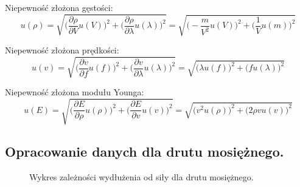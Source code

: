 \documentclass [a4paper,11pt]{article}
\begin{document}
	Niepewność złożona gęstości:
	\begin{equation}
	u(\rho)=\sqrt{\bigg(\frac{\partial \rho}{\partial V}u(V)\bigg)^2+\bigg(\frac{\partial \rho}{\partial \lambda}u(\lambda)\bigg)^2}=\sqrt{\bigg(-\frac{m}{V^2}u(V)\bigg)^2+\bigg(\frac{1}{V}u(m) \bigg)^2}
	\end{equation}
	
	Niepewność złożona prędkości:
	\begin{equation}
	u(v)=\sqrt{\bigg(\frac{\partial v}{\partial f}u(f)\bigg)^2+\bigg(\frac{\partial v}{\partial \lambda}u(\lambda)\bigg)^2}=\sqrt{\bigg(\lambda u(f)\bigg)^2+\bigg(f u(\lambda)\bigg)^2}
	\end{equation}
	
	Niepewność złożona modułu Younga:
	\begin{equation}
			 u(E)=\sqrt{\bigg(\frac{\partial E}{\partial \rho}u(\rho)\bigg)^2+\bigg(\frac{\partial E}{\partial v}u(v)\bigg)^2} =
	\sqrt{\bigg(v^2 u(\rho)\bigg)^2+\bigg(2 \rho v u(v)\bigg)^2}
	\end{equation}


	
	\subsection{Opracowanie danych dla drutu mosiężnego.}\label{sec:drm}
	\renewcommand*{\figurename}{Wykres} 
	\setcounter{figure}{1}
	\begin{figure}[!h]
		\centering

		\caption{Wykres zależności wydłużenia od siły dla drutu mosiężnego.}
		\label{fig:wykmosiadz}
	\end{figure}
\end{document}
